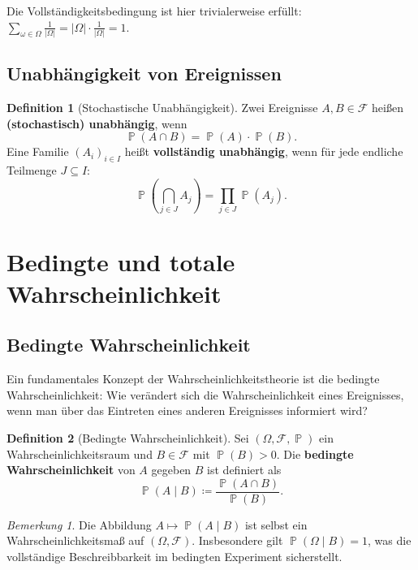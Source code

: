 ﻿\documentclass[12pt,a4paper]{article}
\theoremstyle{definition}
\newtheorem{definition}{Definition}[section]
\theoremstyle{plain}
\theoremstyle{remark}
\newtheorem{bemerkung}{Bemerkung}[section]
\DeclareMathOperator{\Prob}{\mathbb{P}}
\begin{document}
Die Vollständigkeitsbedingung ist hier trivialerweise erfüllt:
$\sum_{\omega\in\Omega} \frac{1}{|\Omega|} = |\Omega| \cdot \frac{1}{|\Omega|} = 1$.

\subsection{Unabhängigkeit von Ereignissen}

\begin{definition}[Stochastische Unabhängigkeit]\label{def:unabh}
  Zwei Ereignisse $A, B \in \mathcal{F}$ heißen \textbf{(stochastisch)
  unabhängig}, wenn
  \[
    \Prob(A \cap B) = \Prob(A) \cdot \Prob(B).
  \]
  Eine Familie $(A_i)_{i \in I}$ heißt \textbf{vollständig unabhängig}, wenn
  für jede endliche Teilmenge $J \subseteq I$:
  \[
    \Prob\!\left(\bigcap_{j \in J} A_j\right) = \prod_{j \in J} \Prob(A_j).
  \]
\end{definition}

\section{Bedingte und totale Wahrscheinlichkeit}
\label{sec:bedingt}

\subsection{Bedingte Wahrscheinlichkeit}

Ein fundamentales Konzept der Wahrscheinlichkeitstheorie ist die bedingte
Wahrscheinlichkeit: Wie verändert sich die Wahrscheinlichkeit eines Ereignisses,
wenn man über das Eintreten eines anderen Ereignisses informiert wird?

\begin{definition}[Bedingte Wahrscheinlichkeit]\label{def:bedingteW}
  Sei $(\Omega, \mathcal{F}, \Prob)$ ein Wahrscheinlichkeitsraum und
  $B \in \mathcal{F}$ mit $\Prob(B) > 0$. Die \textbf{bedingte
  Wahrscheinlichkeit} von $A$ gegeben $B$ ist definiert als
  \[
    \Prob(A \mid B) \coloneqq \frac{\Prob(A \cap B)}{\Prob(B)}.
  \]
\end{definition}

\begin{bemerkung}
  Die Abbildung $A \mapsto \Prob(A \mid B)$ ist selbst ein Wahrscheinlichkeitsmaß
  auf $(\Omega, \mathcal{F})$. Insbesondere gilt $\Prob(\Omega \mid B) = 1$, was
  die vollständige Beschreibbarkeit im bedingten Experiment sicherstellt.
\end{bemerkung}
\end{document}
